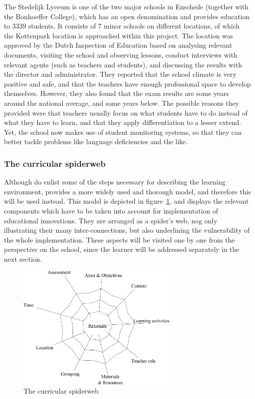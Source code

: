 The Stedelijk Lyceum is one of the two major schools in Enschede (together with the Bonhoeffer College), which has an open denomination and provides education to 3339 students. It consists of 7 minor schools on different locations, of which the Kottenpark location is approached within this project. The location was approved by the Dutch Inspection of Education \cite{inspectierapport} based on analysing relevant documents, visiting the school and observing lessons, conduct interviews with relevant agents (such as teachers and students), and discussing the results with the director and administrator. They reported that the school climate is very positive and safe, and that the teachers have enough professional space to develop themselves. However, they also found that the exam results are some years around the national average, and some years below. The possible reasons they provided were that teachers usually focus on what students have to do instead of what they have to learn, and that they apply differentiation to a lesser extend. Yet, the school now makes use of student monitoring systems, so that they can better tackle problems like language deficiencies and the like.

\subsubsection{The curricular spiderweb}

Although  do enlist some of the steps necessary for describing the learning environment,  provides a more widely used and thorough model, and therefore this will be used instead. This model is depicted in figure~\ref{fig:spiderweb}, and displays the relevant components which have to be taken into account for implementation of educational innovations. They are arranged as a spider's web, nog only illustrating their many inter-connections, but also underlining the vulnerability of the whole implementation. These aspects will be visited one by one from the perspective on the school, since the learner will be addressed separately in the next section.

\begin{figure}
    \centering
    \includegraphics[width=0.7\textwidth]{img/curricular_spiderweb.png}
    \caption{The curricular spiderweb \protect\cite{curricularspiderweb}}
    \label{fig:spiderweb}
\end{figure}

